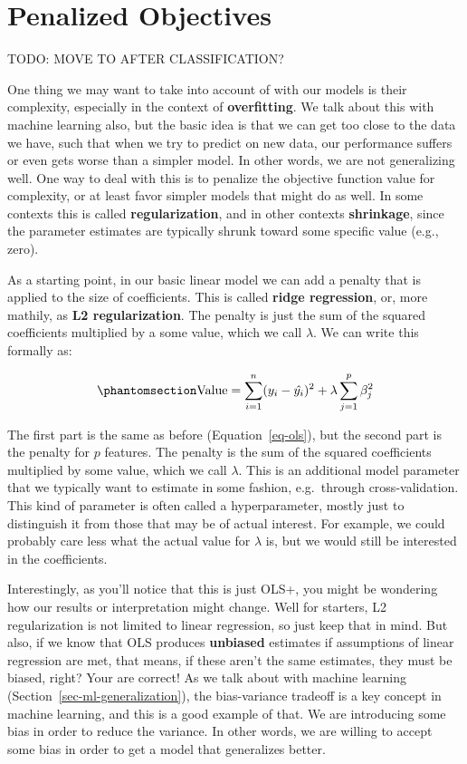 \documentclass[
  letterpaper,
]{krantz}
\begin{document}
\section{Penalized Objectives}\label{sec-estim-penalty}

TODO: MOVE TO AFTER CLASSIFICATION?

One thing we may want to take into account of with our models is their
complexity, especially in the context of \textbf{overfitting}. We talk
about this with machine learning also, but the basic idea is that we can
get too close to the data we have, such that when we try to predict on
new data, our performance suffers or even gets worse than a simpler
model. In other words, we are not generalizing well. One way to deal
with this is to penalize the objective function value for complexity, or
at least favor simpler models that might do as well. In some contexts
this is called \textbf{regularization}, and in other contexts
\textbf{shrinkage}, since the parameter estimates are typically shrunk
toward some specific value (e.g., zero).

As a starting point, in our basic linear model we can add a penalty that
is applied to the size of coefficients. This is called \textbf{ridge
regression}, or, more mathily, as \textbf{L2 regularization}. The
penalty is just the sum of the squared coefficients multiplied by a some
value, which we call \(\lambda\). We can write this formally as:

\begin{equation}\phantomsection\label{eq-ols-ridge}{
\textrm{Value} = \sum_{i=1}^{n} (y_i - \hat{y_i})^2 + \lambda \sum_{j=1}^{p} \beta_j^2
}\end{equation}

The first part is the same as before (Equation~\ref{eq-ols}), but the
second part is the penalty for \(p\) features. The penalty is the sum of
the squared coefficients multiplied by some value, which we call
\(\lambda\). This is an additional model parameter that we typically
want to estimate in some fashion, e.g.~through cross-validation. This
kind of parameter is often called a hyperparameter, mostly just to
distinguish it from those that may be of actual interest. For example,
we could probably care less what the actual value for \(\lambda\) is,
but we would still be interested in the coefficients.

Interestingly, as you'll notice that this is just OLS+, you might be
wondering how our results or interpretation might change. Well for
starters, L2 regularization is not limited to linear regression, so just
keep that in mind. But also, if we know that OLS produces
\textbf{unbiased} estimates if assumptions of linear regression are met,
that means, if these aren't the same estimates, they must be biased,
right? Your are correct! As we talk about with machine learning
(Section~\ref{sec-ml-generalization}), the bias-variance tradeoff is a
key concept in machine learning, and this is a good example of that. We
are introducing some bias in order to reduce the variance. In other
words, we are willing to accept some bias in order to get a model that
generalizes better.
\end{document}
